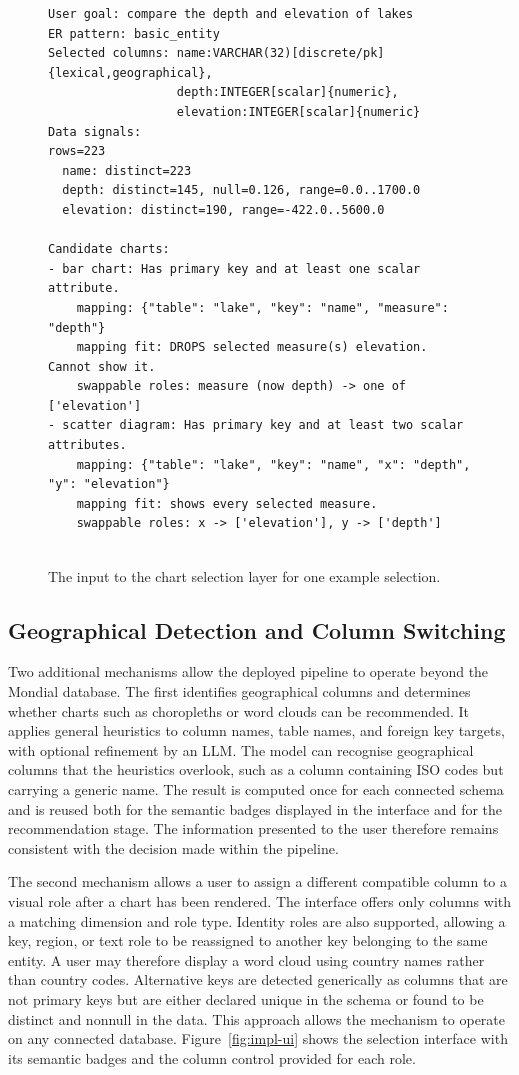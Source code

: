\begin{figure}[htbp]
\begin{lstlisting}[style=prompt]
User goal: compare the depth and elevation of lakes
ER pattern: basic_entity
Selected columns: name:VARCHAR(32)[discrete/pk]{lexical,geographical},
                  depth:INTEGER[scalar]{numeric},
                  elevation:INTEGER[scalar]{numeric}
Data signals:
rows=223
  name: distinct=223
  depth: distinct=145, null=0.126, range=0.0..1700.0
  elevation: distinct=190, range=-422.0..5600.0

Candidate charts:
- bar chart: Has primary key and at least one scalar attribute.
    mapping: {"table": "lake", "key": "name", "measure": "depth"}
    mapping fit: DROPS selected measure(s) elevation. Cannot show it.
    swappable roles: measure (now depth) -> one of ['elevation']
- scatter diagram: Has primary key and at least two scalar attributes.
    mapping: {"table": "lake", "key": "name", "x": "depth", "y": "elevation"}
    mapping fit: shows every selected measure.
    swappable roles: x -> ['elevation'], y -> ['depth']


\end{lstlisting}
\caption{The input to the chart selection layer for one example selection.}
\label{lst:chart-input}
\end{figure}
 

\subsection{Geographical Detection and Column Switching}
\label{sec:impl-geo}

Two additional mechanisms allow the deployed pipeline to operate beyond the Mondial database. The first identifies geographical columns and determines whether charts such as choropleths or word clouds can be recommended. It applies general heuristics to column names, table names, and foreign key targets, with optional refinement by an LLM. The model can recognise geographical columns that the heuristics overlook, such as a column containing ISO codes but carrying a generic name. The result is computed once for each connected schema and is reused both for the semantic badges displayed in the interface and for the recommendation stage. The information presented to the user therefore remains consistent with the decision made within the pipeline.

The second mechanism allows a user to assign a different compatible column to a visual role after a chart has been rendered. The interface offers only columns with a matching dimension and role type. Identity roles are also supported, allowing a key, region, or text role to be reassigned to another key belonging to the same entity. A user may therefore display a word cloud using country names rather than country codes. Alternative keys are detected generically as columns that are not primary keys but are either declared unique in the schema or found to be distinct and nonnull in the data. This approach allows the mechanism to operate on any connected database. Figure~\ref{fig:impl-ui} shows the selection interface with its semantic badges and the column control provided for each role.

